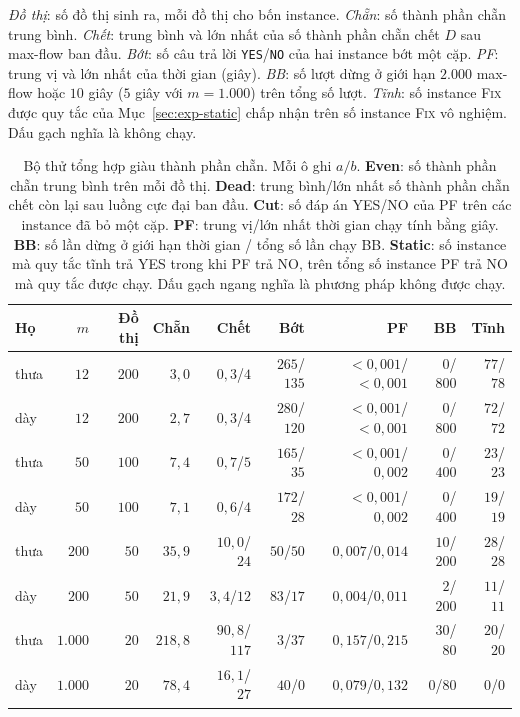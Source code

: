 \documentclass[pdflatex,sn-mathphys-num]{sn-jnl}
\theoremstyle{thmstyleone}%
\theoremstyle{thmstyletwo}%
\theoremstyle{thmstylethree}%
\newcommand{\FIX}{\textup{\textsc{Fix}}}
\newcommand{\YES}{\texttt{YES}}
\newcommand{\NO}{\texttt{NO}}
\begin{document}
\emph{Đồ thị}: số đồ thị sinh ra, mỗi đồ thị cho bốn instance. \emph{Chẵn}: số thành phần chẵn trung bình. \emph{Chết}: trung bình và lớn nhất của số thành phần chẵn chết $D$ sau max-flow ban đầu. \emph{Bớt}: số câu trả lời \YES{}/\NO{} của hai instance bớt một cặp. \emph{PF}: trung vị và lớn nhất của thời gian (giây). \emph{BB}: số lượt dừng ở giới hạn $2.000$ max-flow hoặc $10$ giây ($5$ giây với $m=1.000$) trên tổng số lượt. \emph{Tĩnh}: số instance \FIX{} được quy tắc của Mục~\ref{sec:exp-static} chấp nhận trên số instance \FIX{} vô nghiệm. Dấu gạch nghĩa là không chạy.

\begin{table}[t]
\caption{Bộ thử tổng hợp giàu thành phần chẵn. Mỗi ô ghi $a/b$. \textbf{Even}: số thành phần chẵn trung bình trên mỗi đồ thị. \textbf{Dead}: trung bình/lớn nhất số thành phần chẵn chết còn lại sau luồng cực đại ban đầu. \textbf{Cut}: số đáp án YES/NO của PF trên các instance đã bỏ một cặp. \textbf{PF}: trung vị/lớn nhất thời gian chạy tính bằng giây. \textbf{BB}: số lần dừng ở giới hạn thời gian / tổng số lần chạy BB. \textbf{Static}: số instance mà quy tắc tĩnh trả YES trong khi PF trả NO, trên tổng số instance PF trả NO mà quy tắc được chạy. Dấu gạch ngang nghĩa là phương pháp không được chạy.}
\label{tab:even}
\footnotesize
\begin{tabular*}{\textwidth}{@{\extracolsep\fill}lrrrrrrrr}
\toprule
Họ & $m$ & Đồ thị & Chẵn & Chết & Bớt & PF & BB & Tĩnh \\
\midrule
thưa & $12$ & $200$ & $3{,}0$ & $0{,}3$/$4$ & $265$/$135$ & $<0{,}001$/$<0{,}001$ & $0$/$800$ & $77$/$78$ \\
dày & $12$ & $200$ & $2{,}7$ & $0{,}3$/$4$ & $280$/$120$ & $<0{,}001$/$<0{,}001$ & $0$/$800$ & $72$/$72$ \\
thưa & $50$ & $100$ & $7{,}4$ & $0{,}7$/$5$ & $165$/$35$ & $<0{,}001$/$0{,}002$ & $0$/$400$ & $23$/$23$ \\
dày & $50$ & $100$ & $7{,}1$ & $0{,}6$/$4$ & $172$/$28$ & $<0{,}001$/$0{,}002$ & $0$/$400$ & $19$/$19$ \\
thưa & $200$ & $50$ & $35{,}9$ & $10{,}0$/$24$ & $50$/$50$ & $0{,}007$/$0{,}014$ & $10$/$200$ & $28$/$28$ \\
dày & $200$ & $50$ & $21{,}9$ & $3{,}4$/$12$ & $83$/$17$ & $0{,}004$/$0{,}011$ & $2$/$200$ & $11$/$11$ \\
thưa & $1.000$ & $20$ & $218{,}8$ & $90{,}8$/$117$ & $3$/$37$ & $0{,}157$/$0{,}215$ & $30$/$80$ & $20$/$20$ \\
dày & $1.000$ & $20$ & $78{,}4$ & $16{,}1$/$27$ & $40$/$0$ & $0{,}079$/$0{,}132$ & $0$/$80$ & $0$/$0$ \\

\end{tabular*}
\end{table}
\end{document}
